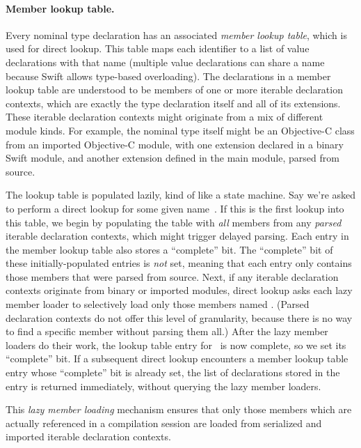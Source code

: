 \documentclass[../generics]{subfiles}
\begin{document}
\paragraph{Member lookup table.}
Every nominal type declaration has an associated \emph{member lookup table}, which is used for direct lookup. This table maps each identifier to a list of value declarations with that name (multiple value declarations can share a name because Swift allows type-based overloading). The declarations in a member lookup table are understood to be members of one or more iterable declaration contexts, which are exactly the type declaration itself and all of its extensions. These iterable declaration contexts might originate from a mix of different module kinds. For example, the nominal type itself might be an Objective-C class from an imported Objective-C module, with one extension declared in a binary Swift module, and another extension defined in the main module, parsed from source.

The lookup table is populated lazily, kind of like a state machine. Say we're asked to perform a direct lookup for some given name~\tX. If this is the first lookup into this table, we begin by populating the table with \emph{all} members from any \emph{parsed} iterable declaration contexts, which might trigger delayed parsing. Each entry in the member lookup table also stores a ``complete'' bit. The ``complete'' bit of these initially-populated entries is \emph{not} set, meaning that each entry only contains those members that were parsed from source. Next, if any iterable declaration contexts originate from binary or imported modules, direct lookup asks each lazy member loader to selectively load only those members named \tX. (Parsed declaration contexts do not offer this level of granularity, because there is no way to find a specific member without parsing them all.) After the lazy member loaders do their work, the lookup table entry for \tX\ is now complete, so we set its ``complete'' bit. If a subsequent direct lookup encounters a member lookup table entry whose ``complete'' bit is already set, the list of declarations stored in the entry is returned immediately, without querying the lazy member loaders.

This \emph{lazy member loading} mechanism ensures that only those members which are actually referenced in a compilation session are loaded from serialized and imported iterable declaration contexts.
\end{document}
